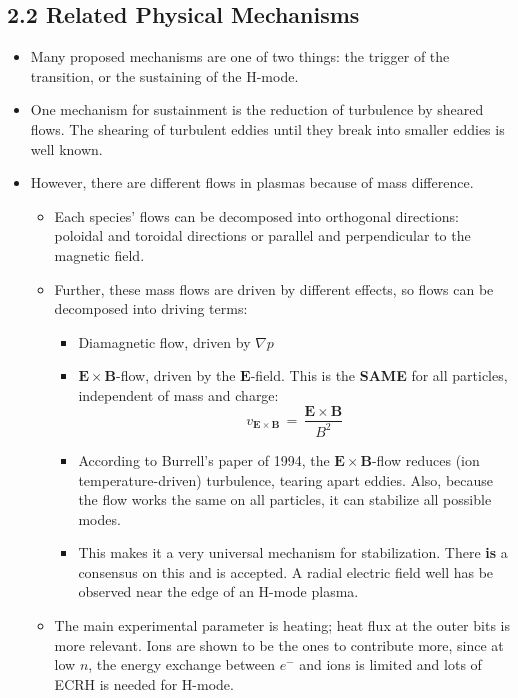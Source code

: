 \documentclass[a4paper]{article}
\begin{document}
\subsection{2.2 Related Physical
Mechanisms}\label{related-physical-mechanisms}

\begin{itemize}
\item
  Many proposed mechanisms are one of two things: the trigger of the
  transition, or the sustaining of the H-mode.
\item
  One mechanism for sustainment is the reduction of turbulence by
  sheared flows. The shearing of turbulent eddies until they break into
  smaller eddies is well known.
\item
  However, there are different flows in plasmas because of mass
  difference.

  \begin{itemize}
  \item
    Each species' flows can be decomposed into orthogonal directions:
    poloidal and toroidal directions or parallel and perpendicular to
    the magnetic field.
  \item
    Further, these mass flows are driven by different effects, so flows
    can be decomposed into driving terms:

    \begin{itemize}
    \item
      Diamagnetic flow, driven by $\nabla p$
    \item
      $\mathbf{E}\times\mathbf{B}$-flow, driven by the
      $\mathbf{E}$-field. This is the \textbf{SAME} for all particles,
      independent of mass and charge:
      \[v_{\mathbf{E}\times\mathbf{B}} \,=\, \frac{\mathbf{E}\times\mathbf{B}}{B^2}\]
    \item
      According to Burrell's paper of 1994, the
      $\mathbf{E}\times\mathbf{B}$-flow reduces (ion temperature-driven)
      turbulence, tearing apart eddies. Also, because the flow works the
      same on all particles, it can stabilize all possible modes.
    \item
      This makes it a very universal mechanism for stabilization. There
      \textbf{is} a consensus on this and is accepted. A radial electric
      field well has be observed near the edge of an H-mode plasma.
    \end{itemize}
  \item
    The main experimental parameter is heating; heat flux at the outer
    bits is more relevant. Ions are shown to be the ones to contribute
    more, since at low $n$, the energy exchange between $e^-$ and ions
    is limited and lots of ECRH is needed for H-mode.


\end{itemize}
\end{itemize}
\end{document}
